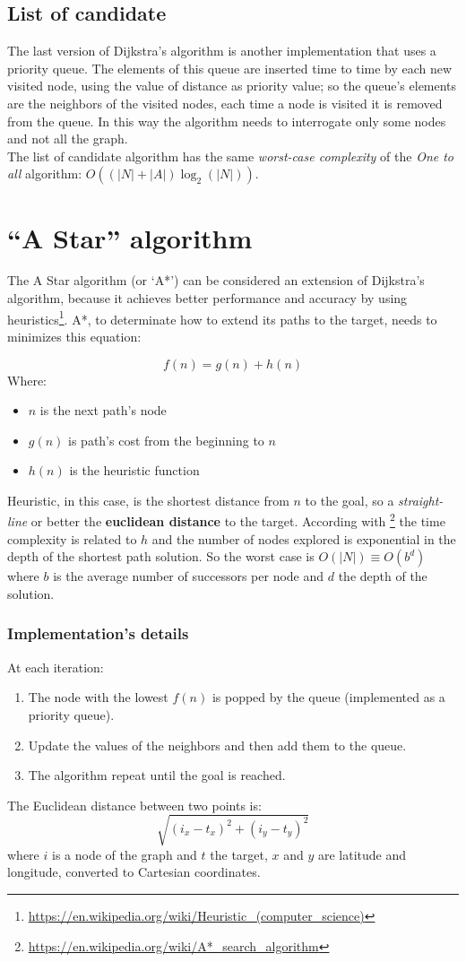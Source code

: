 \documentclass[a4paper,11pt]{report}
\begin{document}
\subsection{List of candidate}
The last version of Dijkstra's algorithm is another implementation that uses a priority queue. The elements of this queue are inserted time to time by each new visited node, using the value of distance as priority value; so the queue's elements are the neighbors of the visited nodes, each time a node is visited it is removed from the queue. In this way the algorithm needs to interrogate only some nodes and not all the graph.\\
The list of candidate algorithm has the same \textit{worst-case complexity} of the \textit{One to all} algorithm: $O((|N|+|A|)\log_2(|N|))$.

\section{``A Star'' algorithm}
The A Star algorithm (or `A*') can be considered an extension of Dijkstra's algorithm, because it achieves better performance and accuracy by using heuristics\footnote{\url{https://en.wikipedia.org/wiki/Heuristic_(computer_science)}}. A*, to determinate how to extend its paths to the target, needs to minimizes this equation:

$$ f(n) = g(n) + h(n)$$
Where:
\begin{itemize}
	\item $n$ is the next path's node
	\item $g(n)$ is path's cost from the beginning to $n$
	\item $h(n)$ is the heuristic function
\end{itemize}
Heuristic, in this case, is the shortest distance from $n$ to the goal, so a \textit{straight-line} or better the \textbf{euclidean distance} to the target.
According with \footnote{\url{https://en.wikipedia.org/wiki/A*_search_algorithm}} the time complexity is related to $h$ and the number of nodes explored is exponential in the depth of the shortest path solution.
So the worst case is $O(|N|) \equiv O(b^d)$ where $b$ is the average number of successors per node and $d$ the depth of the solution.
\subsubsection*{Implementation's details}
At each iteration:
\begin{enumerate}
	\item The node with the lowest $f(n)$ is popped by the queue (implemented as a priority queue).
	\item Update the values of the neighbors and then add them to the queue.
	\item The algorithm repeat until the goal is reached.
\end{enumerate}
The Euclidean distance between two points is: $$\sqrt{(i_x - t_x)^2 + (i_y - t_y)^2}$$
where $i$ is a node of the graph and $t$ the target, $x$ and $y$ are latitude and longitude, converted to Cartesian coordinates.
\end{document}
